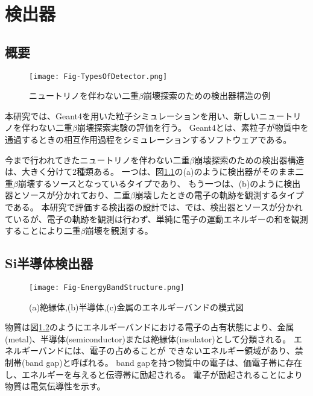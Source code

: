 \documentclass[a4paper,10pt]{jreport}
\begin{document}
\chapter{検出器}




\section{概要}

\begin{figure}[H]
	\center
	\texttt{[image: Fig-TypesOfDetector.png]}
	\caption{ニュートリノを伴わない二重$\beta$崩壊探索のための検出器構造の例} \label{Fig-TyepseOfDetector}
\end{figure}

本研究では、Geant4を用いた粒子シミュレーションを用い、新しいニュートリノを伴わない二重$\beta$崩壊探索実験の評価を行う。
Geant4とは、素粒子が物質中を通過するときの相互作用過程をシミュレーションするソフトウェアである。

今まで行われてきたニュートリノを伴わない二重$\beta$崩壊探索のための検出器構造は、大きく分けて2種類ある。
一つは、図\ref{Fig-TyepseOfDetector}の(a)のように検出器がそのまま二重$\beta$崩壊するソースとなっているタイプであり、
もう一つは、(b)のように検出器とソースが分かれており、二重$\beta$崩壊したときの電子の軌跡を観測するタイプである。
本研究で評価する検出器の設計では、では、検出器とソースが分かれているが、電子の軌跡を観測は行わず、単純に電子の運動エネルギーの和を観測することにより二重$\beta$崩壊を観測する。



\section{Si半導体検出器}

\begin{figure}[H]
	\center
	\texttt{[image: Fig-EnergyBandStructure.png]}
	\caption{(a)絶縁体,(b)半導体,(c)金属のエネルギーバンドの模式図\cite{TUS_text}} \label{Fig-SiliconSemiconductorDetector}
\end{figure}

物質は図\ref{Fig-SiliconSemiconductorDetector}のようにエネルギーバンドにおける電子の占有状態により、金属(metal)、半導体(semiconductor)または絶縁体(insulator)として分類される。
エネルギーバンドには、電子の占めることが できないエネルギー領域があり、禁制帯(band gap)と呼ばれる。
band gapを持つ物質中の電子は、価電子帯に存在し、エネルギーを与えると伝導帯に励起される。
電子が励起されることにより物質は電気伝導性を示す。
\end{document}
